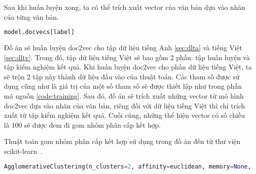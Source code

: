 Sau khi huấn luyện xong, ta có thể trích xuất vector của văn bản dựa vào nhãn của từng văn bản.
\begin{lstlisting}[language=Python]
model.docvecs[label]
\end{lstlisting}

Đồ án sẽ huấn luyện doc2vec cho tập dữ liệu tiếng Anh \ref{sec:dlta} và tiếng Việt \ref{sec:dltv}.
Trong đó, tập dữ liệu tiếng Việt sẽ bao gồm 2 phần: tập huấn luyện và tập kiểm nghiệm kết quả.
Khi huấn luyện doc2vec cho phần dữ liệu tiếng Việt, ta sẽ trộn 2 tập này thành dữ liệu đầu vào của thuật toán.
Các tham số được sử dụng cũng như là giá trị của một số tham số sẽ được thiết lập như trong phần mã nguồn \ref{code:training}.
Sau đó, đồ án sẽ trích xuất những vector từ mô hình doc2vec dựa vào nhãn của văn bản, riêng đối với dữ liệu tiếng Việt thì chỉ trích xuất từ tập kiểm nghiệm kết quả.
Cuối cùng, những thể hiện vector có số chiều là 100 sẽ được đem đi gom nhóm phân cấp kết hợp.

Thuật toán gom nhóm phân cấp kết hợp sử dụng trong đồ án đến từ thư viện scikit-learn~\cite{hac-scikit}.

\begin{lstlisting}[language=Python]
AgglomerativeClustering(n_clusters=2, affinity=euclidean, memory=None, connectivity=None, compute_full_tree=auto, linkage=ward, pooling_func=<function mean>)
\end{lstlisting}
\label{ahc-scikit}

